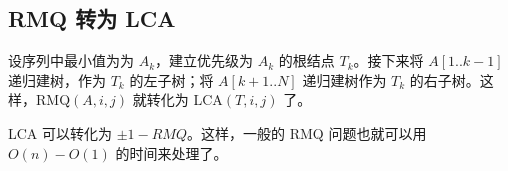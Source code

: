 \subsection{RMQ 转为 LCA}
	设序列中最小值为为 $A_{k}$，建立优先级为 $A_{k}$ 的根结点 $T_{k}$。接下来将 $A[1..k-1]$ 递归建树，作为 $T_{k}$ 的左子树；将 $A[k+1..N]$ 递归建树作为 $T_{k}$ 的右子树。这样，RMQ$(A,i,j)$ 就转化为 LCA$(T,i,j)$ 了。
	
	LCA 可以转化为 $\pm 1-RMQ$。这样，一般的 RMQ 问题也就可以用 $O(n)-O(1)$ 的时间来处理了。
